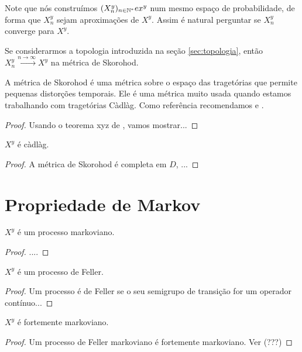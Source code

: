Note que nós construímos $(X_n^y)_{n \in {\mathbb{N^*}}} e x^y$ num mesmo espaço
de probabilidade, de forma que $X_n^y$ sejam aproximações de $X^y$.
Assim é natural perguntar se $X_n^y$ converge para $X^y$.

\begin{teorema}
  \label{teo:convergencia}
  Se considerarmos a topologia introduzida na seção
  \ref{sec:topologia}, então $X_n^y \xrightarrow{n \to \infty} X^y$
  \qc na métrica de Skorohod.
\end{teorema}

A métrica de Skorohod é uma métrica sobre o espaço das tragetórias que
permite pequenas distorções temporais. Ele é uma métrica muito usada
quando estamos trabalhando com tragetórias Càdlàg.  Como referência
recomendamos \cite{billingsley:99} e \cite{ethier:86}.

\begin{proof}
  Usando o teorema xyz de \cite{ethier:86}, vamos mostrar... 
\end{proof}

\begin{corolario}
  \label{cor:proc_cadlag}
  $X^y$ é \qc càdlàg.
\end{corolario}

\begin{proof}
  A métrica de Skorohod é completa em $D$, ...
\end{proof}



\section{Propriedade de Markov}

\begin{teorema}
  \label{teo:proc_markov}
  $X^y$ é um processo markoviano.
\end{teorema}

\begin{proof}
  ....
\end{proof}

\begin{proposicao}
  \label{prop:proc_feller}
  $X^y$ é um processo de Feller.
\end{proposicao}
\begin{proof}
  Um processo é de Feller se o seu semigrupo de transição for um
  operador contínuo...
\end{proof}



\begin{corolario}
  \label{cor:proc_fort_markov}
  $X^y$ é fortemente markoviano.
\end{corolario}
\begin{proof}
  Um processo de Feller markoviano é fortemente markoviano. Ver (???)
\end{proof}




